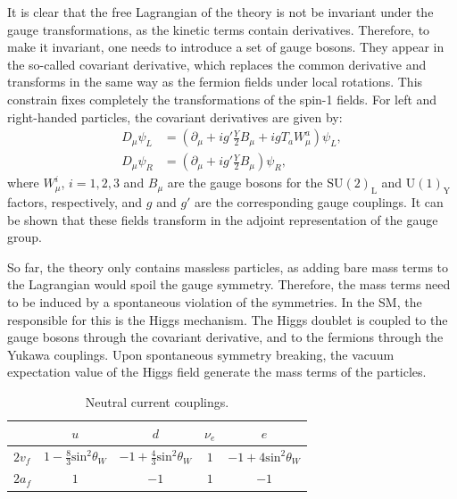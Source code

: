 It is clear that the free Lagrangian of the theory is not be invariant under the gauge transformations, as the kinetic terms contain derivatives. Therefore, to make it invariant, one needs to introduce a set of gauge bosons. They appear in the so-called covariant derivative, which replaces the common derivative and transforms in the same way as the fermion fields under local rotations. This constrain fixes completely the transformations of the spin-1 fields. For left and right-handed particles, the covariant derivatives are given by:
\begin{equation}
	\begin{split}
		D_{\mu} \psi_{L} &= \left(\partial_{\mu} + ig'\frac{Y}{2}B_{\mu}+igT_{a}W^{a}_{\mu}\right)\psi_{L},\\
		D_{\mu} \psi_{R} &= \left(\partial_{\mu} + ig'\frac{Y}{2}B_{\mu}\right)\psi_{R},
	\end{split}
\end{equation}
where $W^{i}_{\mu}$, $i=1,2,3$ and $B_{\mu}$ are the gauge bosons for the $\mathrm{SU}(2)_{\mathrm{L}}$ and $\mathrm{U}(1)_{\mathrm{Y}}$ factors, respectively, and $g$ and $g'$ are the corresponding gauge couplings. It can be shown that these fields transform in the adjoint representation of the gauge group.

So far, the theory only contains massless particles, as adding bare mass terms to the Lagrangian would spoil the gauge symmetry. Therefore, the mass terms need to be induced by a spontaneous violation of the symmetries. In the SM, the responsible for this is the Higgs mechanism. The Higgs doublet is coupled to the gauge bosons through the covariant derivative, and to the fermions through the Yukawa couplings. Upon spontaneous symmetry breaking, the vacuum expectation value of the Higgs field generate the mass terms of the particles.

\begin{table}[t]
	\centering
	\caption{Neutral current couplings.}
			\begin{tabular}{l|cccc}
					& $u$                                       & $d$                                        & $\nu_{e}$ & $e$                              \\[2mm] \hline
			\rule{0pt}{1.1\normalbaselineskip}$2v_{f}$ & $1-\frac{8}{3}\mathrm{sin}^{2}\theta_{W}$ & $-1+\frac{4}{3}\mathrm{sin}^{2}\theta_{W}$ & $1$       & $-1+4\mathrm{sin}^{2}\theta_{W}$ \\[2mm]
			$2a_{f}$ & $1$                                       & $-1$                                       & $1$       & $-1$                            
		\end{tabular}
	\label{tab:sm_nc_couplings}
\end{table}


